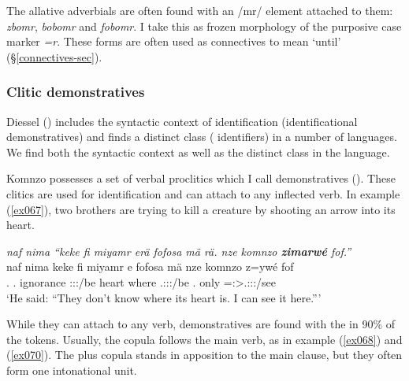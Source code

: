 The allative adverbials are often found with an /mr/ element attached to them: \emph{zbomr}, \emph{bobomr} and \emph{fobomr}. I take this as frozen morphology of the purposive case marker \emph{=r}. These forms are often used as connectives to mean `until' (\S\ref{connectives-sec}).

\subsubsection{Clitic demonstratives} \label{demonstrative-identifiers-subsec}

Diessel (\citeyear{Diessel:2009tg}) includes the syntactic context of identification (identificational demonstratives) and finds a distinct class ( identifiers) in a number of languages. We find both the syntactic context as well as the distinct class in the language.

Komnzo possesses a set of  verbal proclitics which I call  demonstratives (). These clitics are used for identification and can attach to any inflected verb. In example (\ref{ex067}), two brothers are trying to kill a creature by shooting an arrow into its heart.

\begin{exe}
	\ex \emph{naf nima ``keke fi miyamr erä fofosa mä rä. nze komnzo \textbf{zimarwé} fof.''}\\
	\gll naf nima keke fi miyamr e fofosa mä  nze komnzo z=ywé fof\\
	\Tsg.{\Erg} {\Quot} {\Neg} \Third.{\Abs} ignorance \Stpl:\Sbj:\Nonpast:\Ipfv/be heart where \Tsg.\F:\Sbj:\Nonpast:\Ipfv/be \Fsg.{\Erg} only \Prox=\Fsg:\Sbj>\Tsg.\Masc:\Obj:\Nonpast:\Ipfv/see {\Emph}\\
	\trans `He said: ``They don't know where its heart is. I can see it here.'''\\ 
	\label{ex067}
\end{exe}

While they can attach to any verb,  demonstratives are found with the  in 90\% of the tokens. Usually, the copula follows the main verb, as in example (\ref{ex068}) and (\ref{ex070}). The   plus copula stands in apposition to the main clause, but they often form one intonational unit.

